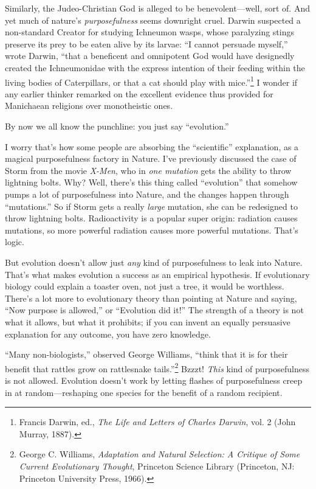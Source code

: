  Similarly, the Judeo-Christian God is alleged to be
benevolent---well, sort of. And yet much of nature's
\textit{purposefulness} seems downright cruel. Darwin suspected a
non-standard Creator for studying Ichneumon wasps, whose paralyzing
stings preserve its prey to be eaten alive by its larvae:
``I cannot persuade myself,'' wrote
Darwin, ``that a beneficent and omnipotent God would
have designedly created the Ichneumonidae with the express intention of
their feeding within the living bodies of Caterpillars, or that a cat
should play with mice.''\footnote{Francis Darwin, ed., \textit{The Life and Letters of Charles
Darwin}, vol. 2 (John Murray, 1887).} I wonder
if any earlier thinker remarked on the excellent evidence thus provided
for Manichaean religions over monotheistic ones.


 By now we all know the punchline: you just say
``evolution.''


 I worry that's how some people are absorbing the
``scientific'' explanation, as a
magical purposefulness factory in Nature. I've
previously discussed the case of Storm from the movie \textit{X-Men},
who in \textit{one mutation} gets the ability to throw lightning bolts.
Why? Well, there's this thing called
``evolution'' that somehow pumps a
lot of purposefulness into Nature, and the changes happen through
``mutations.'' So if Storm gets a
really \textit{large} mutation, she can be redesigned to throw
lightning bolts. Radioactivity is a popular super origin: radiation
causes mutations, so more powerful radiation causes more powerful
mutations. That's logic.


 But evolution doesn't allow just \textit{any} kind
of purposefulness to leak into Nature. That's what
makes evolution a success as an empirical hypothesis. If evolutionary
biology could explain a toaster oven, not just a tree, it would be
worthless. There's a lot more to evolutionary theory
than pointing at Nature and saying, ``Now purpose is
allowed,'' or ``Evolution did
it!'' The strength of a theory is not what it allows,
but what it prohibits; if you can invent an equally persuasive
explanation for any outcome, you have zero knowledge.


 ``Many non-biologists,''
observed George Williams, ``think that it is for their
benefit that rattles grow on rattlesnake
tails.''\footnote{George C. Williams, \textit{Adaptation and Natural Selection: A
Critique of Some Current Evolutionary Thought}, Princeton Science
Library (Princeton, NJ: Princeton University Press, 1966).} Bzzzt! \textit{This} kind
of purposefulness is not allowed. Evolution doesn't
work by letting flashes of purposefulness creep in at
random---reshaping one species for the benefit of a random recipient.


